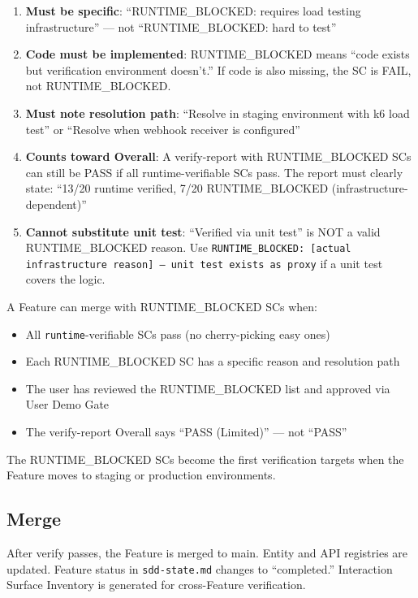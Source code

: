 \documentclass[11pt,a4paper,openright,twoside]{report}
\newcommand{\file}[1]{\texttt{#1}}
\begin{document}
\begin{enumerate}[nosep]
  \item \textbf{Must be specific}: ``RUNTIME\_BLOCKED: requires load testing infrastructure'' --- not ``RUNTIME\_BLOCKED: hard to test''
  \item \textbf{Code must be implemented}: RUNTIME\_BLOCKED means ``code exists but verification environment doesn't.'' If code is also missing, the SC is FAIL, not RUNTIME\_BLOCKED.
  \item \textbf{Must note resolution path}: ``Resolve in staging environment with k6 load test'' or ``Resolve when webhook receiver is configured''
  \item \textbf{Counts toward Overall}: A verify-report with RUNTIME\_BLOCKED SCs can still be PASS if all runtime-verifiable SCs pass. The report must clearly state: ``13/20 runtime verified, 7/20 RUNTIME\_BLOCKED (infrastructure-dependent)''
  \item \textbf{Cannot substitute unit test}: ``Verified via unit test'' is NOT a valid RUNTIME\_BLOCKED reason. Use \texttt{RUNTIME\_BLOCKED: [actual infrastructure reason] --- unit test exists as proxy} if a unit test covers the logic.
\end{enumerate}

\begin{tipbox}
A Feature can merge with RUNTIME\_BLOCKED SCs when:
\begin{itemize}[nosep]
  \item All \texttt{runtime}-verifiable SCs pass (no cherry-picking easy ones)
  \item Each RUNTIME\_BLOCKED SC has a specific reason and resolution path
  \item The user has reviewed the RUNTIME\_BLOCKED list and approved via User Demo Gate
  \item The verify-report Overall says ``PASS (Limited)'' --- not ``PASS''
\end{itemize}
The RUNTIME\_BLOCKED SCs become the first verification targets when the Feature moves to staging or production environments.
\end{tipbox}

\subsection{Merge}

After verify passes, the Feature is merged to main. Entity and API registries are updated. Feature status in \file{sdd-state.md} changes to ``completed.'' Interaction Surface Inventory is generated for cross-Feature verification.
\end{document}
